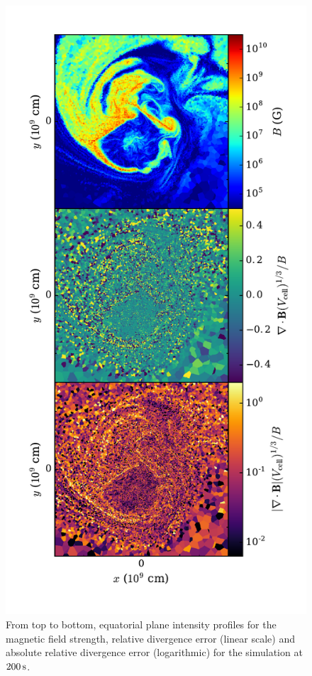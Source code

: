


\begin{figure}
\centering
\includegraphics[angle=0,width=0.6\columnwidth]{chapter4_zhu+15/figures/bdiv.pdf}
\caption{From top to bottom, equatorial plane intensity profiles for the magnetic field strength, relative divergence error (linear scale) and absolute relative divergence error (logarithmic) for the simulation at $200\,\mathrm{s}$.}
\label{fig:c4_bdiv}
\end{figure}

